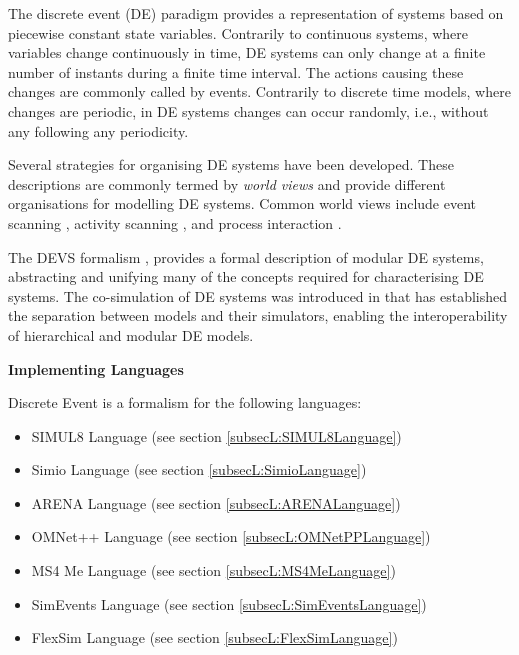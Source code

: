 
The discrete event (DE) paradigm provides a representation of systems based on piecewise constant state variables. Contrarily to continuous systems, where variables change continuously in time, DE systems can only change at a finite number of instants during a finite time interval. The actions causing these changes are commonly called by events. Contrarily to discrete time models, where changes are periodic, in DE systems changes can occur randomly, i.e., without any following any periodicity.

Several strategies for organising DE systems have been developed. These descriptions are commonly termed by {\em world views} and  provide different organisations for modelling DE systems. Common world views include event scanning \cite{Kiviat:1968:SIMSCRIPT}, activity scanning \cite{Buxton:1962:CSL}, and process interaction \cite{Dahl:1966:Simula}.

The DEVS formalism \cite{Zeigler:1976:TMS}, provides a formal description of modular DE systems, abstracting and unifying many of the concepts required for characterising DE systems. The co-simulation of DE systems was introduced in \cite{Zeigler:1984:Multifaceted} that has established the separation between models and their simulators, enabling the interoperability of hierarchical and modular DE models.

\textbf{Implementing Languages}

Discrete Event is a formalism for the following languages:
\begin{itemize}
	\item SIMUL8 Language (see section \ref{subsecL:SIMUL8Language})
	\item Simio Language (see section \ref{subsecL:SimioLanguage})
	\item ARENA Language (see section \ref{subsecL:ARENALanguage})
	\item OMNet++ Language (see section \ref{subsecL:OMNetPPLanguage})
	\item MS4 Me Language (see section \ref{subsecL:MS4MeLanguage})
	\item SimEvents Language (see section \ref{subsecL:SimEventsLanguage})
	\item FlexSim Language (see section \ref{subsecL:FlexSimLanguage})
\end{itemize}





